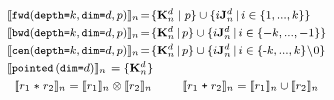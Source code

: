 \begin{align*}
{\small{
%
%
\setlength{\arraycolsep}{0.2em}
\def\arraystretch{1.4}
\hspace{-0.2em}
\begin{array}{rl}
\multicolumn{2}{l}{\interp{\stenFwdSR{k}{d}{p}}_n\!=\!
 \{\zeroEntry{d}{n} \mid p \} \cup
 \{i\singleEntry{d}{n} \,|\, i \in \{1, ..., k\} \}} \\
\multicolumn{2}{l}{\interp{\stenBwdSR{k}{d}{p}}_n\!=\!
\{\zeroEntry{d}{n} \,|\, p \} \cup
\{i\singleEntry{d}{n} \,|\, i \in \{-k, ..., -1\} \}} \\
\multicolumn{2}{l}{
\interp{\stenCenSR{k}{d}{p}}_n\!=\!
\{ \zeroEntry{d}{n} \,|\, p \} \cup
\{i\singleEntry{d}{n} \,|\, i \in \{\text{-}k,..., k\}\!\setminus\!0 \}}
\\
\interp{\stenReflS{d}}_n & = \{ \zeroEntry{d}{n} \} \\
%
%
\multicolumn{2}{c}{
\interp{r_1 \; \texttt{$\ast$} \; r_2}_n
= \interp{r_1}_n \otimes \interp{r_2}_n \;\;
%
%
\qquad
\interp{r_1 \; \texttt{+} \; r_2}_n
= \interp{r_1}_n \cup \interp{r_2}_n}
\end{array}
}}
\end{align*}\vspace{-0.75em}